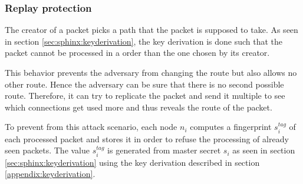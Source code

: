 \subsubsection{Replay protection}
\label{sec:sphinx:replayprotection}

The creator of a packet picks a path that the packet is supposed to take. As seen in section \ref{sec:sphinx:keyderivation}, the key derivation is done such that the packet cannot be processed in a order than the one chosen by its creator.

This behavior prevents the adversary from changing the route but also allows no other route. Hence the adversary can be sure that there is no second possible route. Therefore, it can try to replicate the packet and send it multiple to see which connections get used more and thus reveals the route of the packet.

To prevent from this attack scenario, each node $n_i$ computes a fingerprint $s_i^{tag}$ of each processed packet and stores it in order to refuse the processing of already seen packets. The value $s_i^{tag}$ is generated from master secret $s_i$ as seen in section \ref{sec:sphinx:keyderivation} using the key derivation described in section \ref{appendix:keyderivation}.
